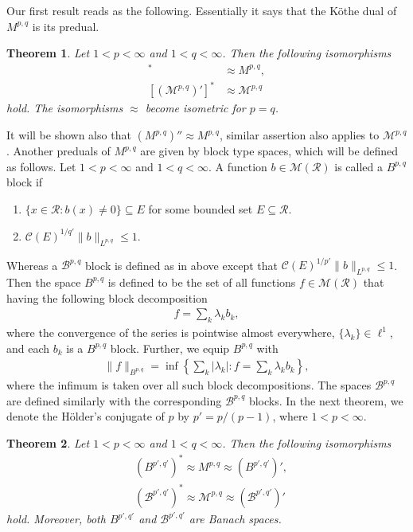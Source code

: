 \documentclass[10pt,reqno]{amsart}
\newtheorem{theorem}{Theorem}[section]
\numberwithin{equation}{section}
\begin{document}
Our first result reads as the following. Essentially it says that the K\"othe dual of $M^{p,q}$ is its predual.
\begin{theorem}\label{first predual}
Let $1<p<\infty$ and $1<q<\infty$. Then the following isomorphisms
\begin{align*}
[(M^{p,q})']^{\ast}&\approx M^{p,q},\\
[(\mathcal{M}^{p,q})']^{\ast}&\approx\mathcal{M}^{p,q}
\end{align*}
hold. The isomorphisms $\approx$ become isometric for $p=q$.
\end{theorem}

It will be shown also that $(M^{p,q})''\approx M^{p,q}$, similar assertion also applies to $\mathcal{M}^{p,q}$. Another preduals of $M^{p,q}$ are given by block type spaces, which will be defined as follows. Let $1<p<\infty$ and $1<q<\infty$. A function $b\in\mathcal{M}(\mathcal{R})$ is called a $B^{p,q}$ block if 
\begin{enumerate}
\item $\{x\in\mathcal{R}:b(x)\ne 0\}\subseteq E$ for some bounded set $E\subseteq\mathcal{R}$.

\medskip
\item $\mathcal{C}(E)^{1/q'}\|b\|_{L^{p,q}}\leq 1$.
\end{enumerate}
Whereas a $\mathcal{B}^{p,q}$ block is defined as in above except that $\mathcal{C}(E)^{1/p'}\|b\|_{L^{p,q}}\leq 1$. Then the space $B^{p,q}$ is defined to be the set of all functions $f\in\mathcal{M}(\mathcal{R})$ that having the following block decomposition
\begin{align}\label{definition of block decomposition}
f=\sum_{k}\lambda_{k}b_{k},
\end{align}
where the convergence of the series is pointwise almost everywhere, $\{\lambda_{k}\}\in\ell^{1}$, and each $b_{k}$ is a $B^{p,q}$ block. Further, we equip $B^{p,q}$ with
\begin{align}\label{definition of block norm}
\|f\|_{B^{p,q}}=\inf\left\{\sum_{k}|\lambda_{k}|:f=\sum_{k}\lambda_{k}b_{k}\right\},
\end{align}
where the infimum is taken over all such block decompositions. The spaces $\mathcal{B}^{p,q}$ are defined similarly with the corresponding $\mathcal{B}^{p,q}$ blocks. In the next theorem, we denote the H\"older's conjugate of $p$ by $p'=p/(p-1)$, where $1<p<\infty$. 
\begin{theorem}\label{second predual}
Let $1<p<\infty$ and $1<q<\infty$. Then the following isomorphisms
\begin{align*}
&(B^{p',q'})^{\ast}\approx M^{p,q}\approx(B^{p',q'})',\\
&(\mathcal{B}^{p',q'})^{\ast}\approx\mathcal{M}^{p,q}\approx(\mathcal{B}^{p',q'})'
\end{align*}
hold. Moreover, both $B^{p',q'}$ and $\mathcal{B}^{p',q'}$ are Banach spaces.
\end{theorem}
\end{document}
